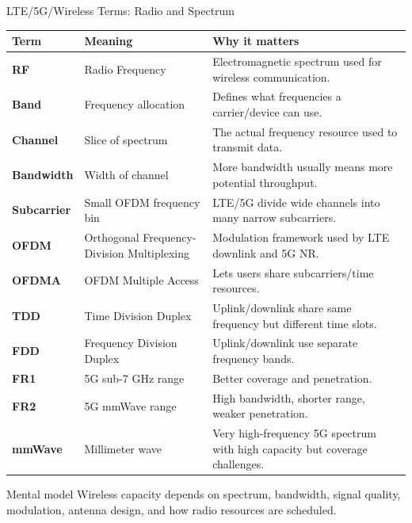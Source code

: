 \documentclass[aspectratio=169]{beamer}
\begin{document}
\begin{frame}{LTE/5G/Wireless Terms: Radio and Spectrum}
\tiny
\begin{tabular}{p{2.0cm} p{3.4cm} p{6.7cm}}
\toprule
\textbf{Term} & \textbf{Meaning} & \textbf{Why it matters} \\
\midrule
\textbf{RF} & Radio Frequency & Electromagnetic spectrum used for wireless communication. \\
\textbf{Band} & Frequency allocation & Defines what frequencies a carrier/device can use. \\
\textbf{Channel} & Slice of spectrum & The actual frequency resource used to transmit data. \\
\textbf{Bandwidth} & Width of channel & More bandwidth usually means more potential throughput. \\
\textbf{Subcarrier} & Small OFDM frequency bin & LTE/5G divide wide channels into many narrow subcarriers. \\
\textbf{OFDM} & Orthogonal Frequency-Division Multiplexing & Modulation framework used by LTE downlink and 5G NR. \\
\textbf{OFDMA} & OFDM Multiple Access & Lets users share subcarriers/time resources. \\
\textbf{TDD} & Time Division Duplex & Uplink/downlink share same frequency but different time slots. \\
\textbf{FDD} & Frequency Division Duplex & Uplink/downlink use separate frequency bands. \\
\textbf{FR1} & 5G sub-7 GHz range & Better coverage and penetration. \\
\textbf{FR2} & 5G mmWave range & High bandwidth, shorter range, weaker penetration. \\
\textbf{mmWave} & Millimeter wave & Very high-frequency 5G spectrum with high capacity but coverage challenges. \\
\bottomrule
\end{tabular}

\vspace{0.15cm}
\begin{block}{Mental model}
Wireless capacity depends on spectrum, bandwidth, signal quality, modulation, antenna design, and how radio resources are scheduled.
\end{block}
\end{frame}
\end{document}
